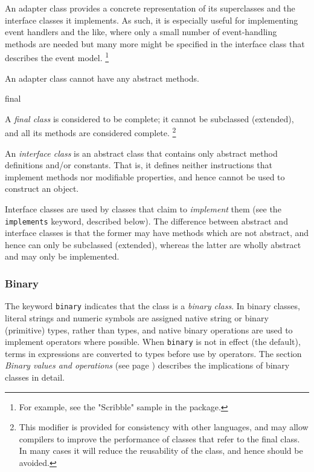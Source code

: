 \begin{description}
An adapter class provides a concrete representation of its superclasses
and the interface classes it implements.  As such, it is especially
useful for implementing event handlers and the like, where only a small
number of event-handling methods are needed but many more might be
specified in the interface class that describes the event model.
\footnote{
For example, see the "Scribble" sample in the \nr{} package.
}
 
An adapter class cannot have any abstract methods.
\item{final}

A \emph{final class} is considered to be complete; it cannot be
subclassed (extended), and all its methods are considered complete.
\footnote{
This modifier is provided for consistency with other languages, and may
allow compilers to improve the performance of classes that refer to the
final class.
In many cases it will reduce the reusability of the class, and hence
should be avoided.
}
\item[interface]\label{refinterf}

An \emph{interface class} is an abstract class that contains only
abstract method definitions and/or constants.  That is, it defines
neither instructions that implement methods nor modifiable properties,
and hence cannot be used to construct an object.
 
Interface classes are used by classes that claim to \emph{implement}
them (see the \texttt{implements} keyword, described below).
The difference between abstract and interface classes is that
the former may have methods which are not abstract, and hence can only
be subclassed (extended), whereas the latter are wholly abstract and
may only be implemented.
\end{description}
\subsubsection{Binary}\label{refbincla}
 
The keyword \texttt{binary} indicates that the class is a \emph{binary
class}.
In binary classes, literal strings and numeric symbols are assigned
native string or binary (primitive) types, rather than \nr{} types,
and native binary operations are used to implement operators where
possible.
When \texttt{binary} is not in effect (the default), terms in
expressions are converted to \nr{} types before use by operators.
The section  \emph{Binary values and operations} (see page \pageref{refbinary}) 
describes the implications of binary classes in detail.
 
